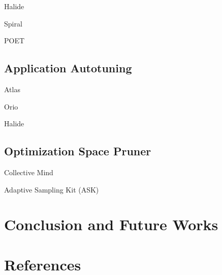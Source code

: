 \documentclass[review]{elsarticle}
\begin{document}
  Halide

  Spiral

  POET

  \subsection{Application Autotuning}

  Atlas

  Orio

  Halide

  \subsection{Optimization Space Pruner}

  Collective Mind

  Adaptive Sampling Kit (ASK)

\section{Conclusion and Future Works}


\section*{References}


\end{document}
